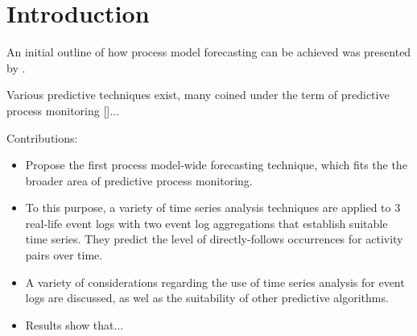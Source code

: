 \section{Introduction}\label{sec:introduction}

An initial outline of how process model forecasting can be achieved was presented by \cite{DBLP:conf/bpm/PollPRRR18}.

Various predictive techniques exist, many coined under the term of predictive process monitoring []...


Contributions:
\begin{itemize}
	\item Propose the first process model-wide forecasting technique, which fits the the broader area of predictive process monitoring.
	\item To this purpose, a variety of time series analysis techniques are applied to 3 real-life event logs with two event log aggregations that establish suitable time series. They predict the level of directly-follows occurrences for activity pairs over time.
	\item A variety of considerations regarding the use of time series analysis for event logs are discussed, as wel as the suitability of other predictive algorithms.
	\item Results show that... 
\end{itemize}